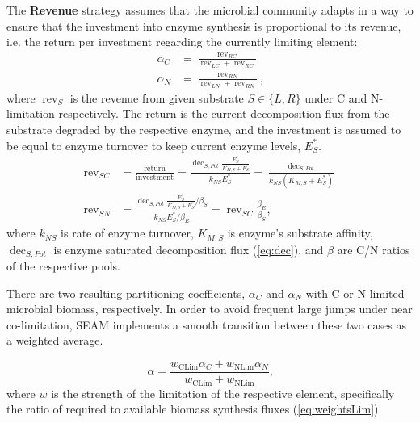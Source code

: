 The \textbf{Revenue} strategy assumes that the microbial community adapts in a
way to ensure that the investment into enzyme synthesis is proportional to its
revenue, i.e.
the  return per investment regarding the currently
limiting element:
\begin{subequations}
\label{eq:allocRev}
\begin{align}
\alpha_C &= \frac{\operatorname{rev}_{RC}}{\operatorname{rev}_{LC} + \operatorname{rev}_{RC}} 
\\
\alpha_N &= \frac{\operatorname{rev}_{RN}}{\operatorname{rev}_{LN} + \operatorname{rev}_{RN}} 
\text{,} 
\end{align}
\end{subequations}
where $\operatorname{rev}_S$ is the revenue from given substrate $S \in \{L,R\}$
under C and N-limitation respectively. The return is the current decomposition
flux from the substrate degraded by the respective enzyme, and the investment is
assumed to be equal to enzyme turnover to keep current enzyme levels, $E_S^*$.
\begin{subequations}
\label{eq:allocRev2}
\begin{align}
\operatorname{rev}_{SC} &= \frac{\text{return}}{\text{investment}} 
= \frac{\operatorname{dec}_{S,Pot} \frac{E_S^*}{K_{M,S} + E_S^*}} {k_{NS}E_S^*} 
= \frac{\operatorname{dec}_{S,Pot}} {k_{NS}(K_{M,S} + E_S^*)} 
\\ 
\operatorname{rev}_{SN} &= \frac{\operatorname{dec}_{S,Pot}
\frac{E_S^*}{K_{M,S} + E_S^*} / \beta_S} {k_{NS} E_S^* / \beta_E} 
= \operatorname{rev}_{SC} \frac{\beta_E}{\beta_S}
\text{,} 
\end{align}
\end{subequations}
where $k_{NS}$ is rate of enzyme turnover, $K_{M,S}$ is enzyme's substrate
affinity, $\operatorname{dec}_{S,Pot}$ is
enzyme saturated decomposition flux (\ref{eq:dec}), and $\beta$ are C/N ratios
of the respective pools.

There are two resulting partitioning coefficients, $\alpha_C$ and $\alpha_N$
with C or N-limited microbial biomass, respectively. In order to avoid frequent large jumps
under near co-limitation, SEAM implements a smooth transition between these two
cases as a weighted average.

\begin{equation}
\label{eq:allocRev3}
\alpha = \frac{w_{\operatorname{CLim}} \alpha_C + w_{\operatorname{NLim}}
\alpha_N}{w_{\operatorname{CLim}}  + w_{\operatorname{NLim}} } 
\text{,} 
\end{equation}
where $w$ is the strength of the limitation of the respective element,
specifically the ratio of required to available biomass synthesis fluxes
(\ref{eq:weightsLim}).



